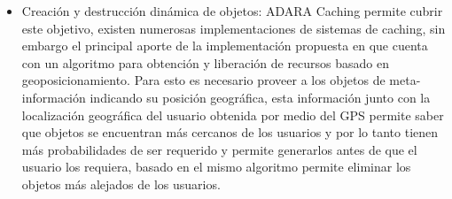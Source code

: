 \documentclass[12pt,a4paper,spanish,openany]{book}
\begin{document}
\begin{itemize}
  \item Creación y destrucción dinámica de objetos: ADARA Caching permite cubrir
  este objetivo, existen numerosas implementaciones de sistemas de caching, sin
  embargo el principal aporte de la implementación propuesta en que cuenta con
  un algoritmo para obtención y liberación de recursos basado en
  geoposicionamiento. Para esto es necesario proveer a los objetos de
  meta-información indicando su posición geográfica, esta información junto con
  la localización geográfica del usuario obtenida por medio del GPS permite
  saber que objetos se encuentran más cercanos de los usuarios y por lo tanto
  tienen más probabilidades de ser requerido y permite generarlos antes de que
  el usuario los requiera, basado en el mismo algoritmo permite eliminar los
  objetos más alejados de los usuarios.
\end{itemize}
\end{document}
